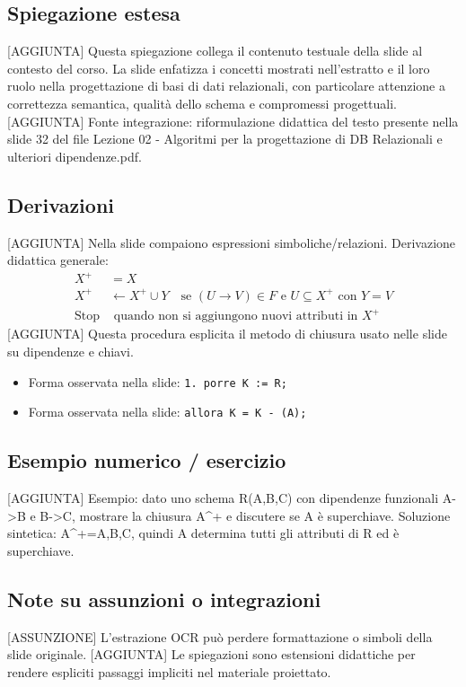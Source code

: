 \documentclass[11pt]{article}
\begin{document}
\subsection*{Spiegazione estesa}
[AGGIUNTA] Questa spiegazione collega il contenuto testuale della slide al contesto del corso. La slide enfatizza i concetti mostrati nell'estratto e il loro ruolo nella progettazione di basi di dati relazionali, con particolare attenzione a correttezza semantica, qualità dello schema e compromessi progettuali.
[AGGIUNTA] Fonte integrazione: riformulazione didattica del testo presente nella slide 32 del file Lezione 02 - Algoritmi per la progettazione di DB Relazionali e ulteriori dipendenze.pdf.
\subsection*{Derivazioni}
[AGGIUNTA] Nella slide compaiono espressioni simboliche/relazioni. Derivazione didattica generale:
\begin{align*}
X^+ &= X \\
X^+ &\leftarrow X^+ \cup Y \quad \text{se } (U \to V) \in F \text{ e } U \subseteq X^+ \text{ con } Y=V \\
\text{Stop} &\text{ quando non si aggiungono nuovi attributi in } X^+
\end{align*}
[AGGIUNTA] Questa procedura esplicita il metodo di chiusura usato nelle slide su dipendenze e chiavi.
\begin{itemize}[leftmargin=*]
\item Forma osservata nella slide: \texttt{1.   porre K := R;}
\item Forma osservata nella slide: \texttt{allora K = K - (A);}
\end{itemize}
\subsection*{Esempio numerico / esercizio}
[AGGIUNTA] Esempio: dato uno schema R(A,B,C) con dipendenze funzionali A->B e B->C, mostrare la chiusura A^+ e discutere se A è superchiave. Soluzione sintetica: A^+={A,B,C}, quindi A determina tutti gli attributi di R ed è superchiave.
\subsection*{Note su assunzioni o integrazioni}
[ASSUNZIONE] L'estrazione OCR può perdere formattazione o simboli della slide originale.
[AGGIUNTA] Le spiegazioni sono estensioni didattiche per rendere espliciti passaggi impliciti nel materiale proiettato.
\end{document}
